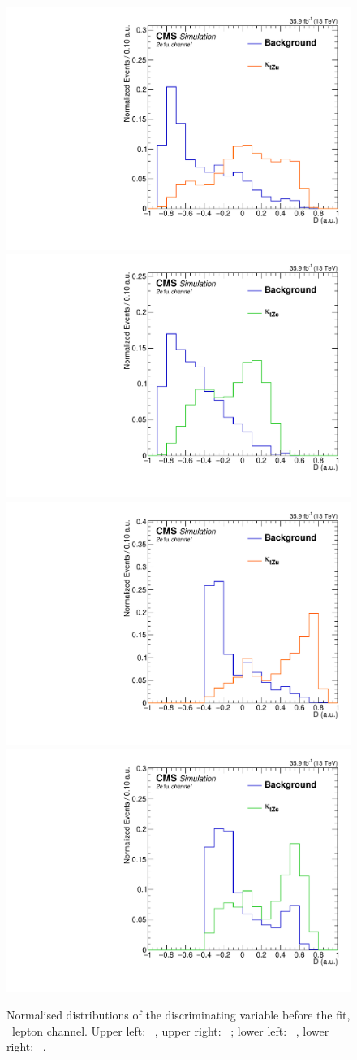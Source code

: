 \begin{figure}[htbp]
	\centering
	\includegraphics[width=0.49\linewidth]{6_Search/Figures/BDTdistributionsNorm/toppair_Zut_BDT_eeu_Normalized}
	\includegraphics[width=0.49\linewidth]{6_Search/Figures/BDTdistributionsNorm/toppair_Zct_BDT_eeu_Normalized}
	\includegraphics[width=0.49\linewidth]{6_Search/Figures/BDTdistributionsNorm/singletop_Zut_BDT_eeu_Normalized}
	\includegraphics[width=0.49\linewidth]{6_Search/Figures/BDTdistributionsNorm/singletop_Zct_BDT_eeu_Normalized}
	\caption{Normalised distributions of the discriminating variable before the fit, \eemu\ lepton channel. Upper left: \TTSR\ \Zut , upper right: \TTSR\ \Zct ; lower left: \STSR\  \Zut , lower right: \STSR\  \Zct .}
	\label{fig:bdteeunorm}
\end{figure}	


